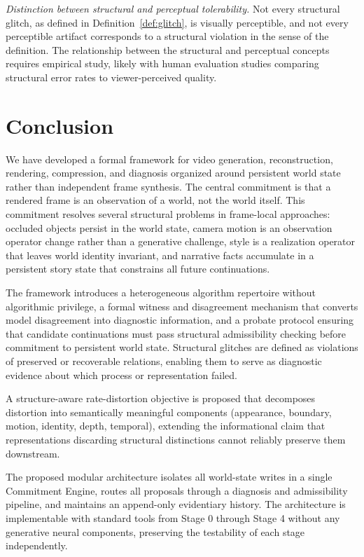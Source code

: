 \documentclass[11pt,a4paper]{article}
\theoremstyle{plain}
\theoremstyle{definition}
\theoremstyle{remark}
\begin{document}
\textit{Distinction between structural and perceptual tolerability.} Not every structural glitch, as defined in Definition~\ref{def:glitch}, is visually perceptible, and not every perceptible artifact corresponds to a structural violation in the sense of the definition. The relationship between the structural and perceptual concepts requires empirical study, likely with human evaluation studies comparing structural error rates to viewer-perceived quality.

\section{Conclusion}
\label{sec:conclusion}

We have developed a formal framework for video generation, reconstruction, rendering, compression, and diagnosis organized around persistent world state rather than independent frame synthesis. The central commitment is that a rendered frame is an observation of a world, not the world itself. This commitment resolves several structural problems in frame-local approaches: occluded objects persist in the world state, camera motion is an observation operator change rather than a generative challenge, style is a realization operator that leaves world identity invariant, and narrative facts accumulate in a persistent story state that constrains all future continuations.

The framework introduces a heterogeneous algorithm repertoire without algorithmic privilege, a formal witness and disagreement mechanism that converts model disagreement into diagnostic information, and a probate protocol ensuring that candidate continuations must pass structural admissibility checking before commitment to persistent world state. Structural glitches are defined as violations of preserved or recoverable relations, enabling them to serve as diagnostic evidence about which process or representation failed.

A structure-aware rate-distortion objective is proposed that decomposes distortion into semantically meaningful components (appearance, boundary, motion, identity, depth, temporal), extending the informational claim that representations discarding structural distinctions cannot reliably preserve them downstream.

The proposed modular architecture isolates all world-state writes in a single Commitment Engine, routes all proposals through a diagnosis and admissibility pipeline, and maintains an append-only evidentiary history. The architecture is implementable with standard tools from Stage 0 through Stage 4 without any generative neural components, preserving the testability of each stage independently.
\end{document}

